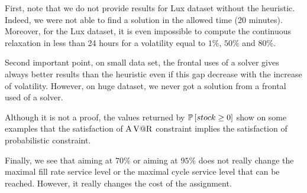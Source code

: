 First, note that we do not provide results for Lux dataset without the heuristic.
Indeed, we were not able to find a solution in the allowed time (20 minutes).
Moreover, for the Lux dataset, it is even impossible to compute the continuous relaxation in less than 24 hours for a volatility equal to $1\%$, $50\%$ and $80\%$.


Second important point, on small data set, the frontal uses of a solver gives always better results than the heuristic even if this gap decrease with the increase of volatility.
However, on huge dataset, we never got a solution from a frontal used of a solver.


Although it is not a proof, the values returned by $\prob\sqbracket{stock\ge0}$ show on some examples that the satisfaction of $\operatorname{A\operatorname{V@R}}$ constraint implies the satisfaction of probabilistic constraint.


Finally, we see that aiming at $70\%$ or aiming at $95\%$ does not really change the maximal fill rate service level or the maximal cycle service level that can be reached.
However, it really changes the cost of the assignment.




